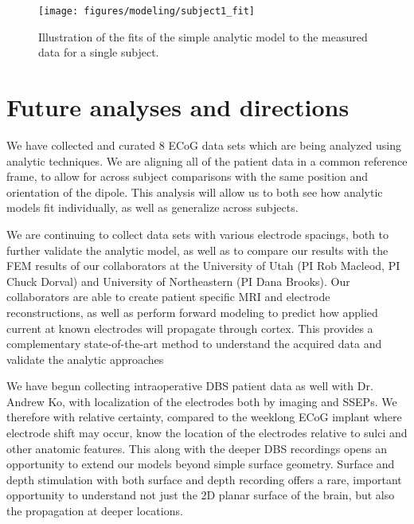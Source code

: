 \begin{figure}[ht]
	\centering
	\texttt{[image: figures/modeling/subject1\_fit]}
	\caption[Example one layer fit]{Illustration of the fits of the simple analytic model to the measured data for a single subject. 
	}
	\label{fig:exampOneLayerFit}
\end{figure}

\section{Future analyses and directions}

We have collected and curated 8 ECoG data sets which are being analyzed using analytic techniques. We are aligning all of the patient data in a common reference frame, to allow for across subject comparisons with the same position and orientation of the dipole. This analysis will allow us to both see how analytic models fit individually, as well as generalize across subjects. 

We are continuing to collect data sets with various electrode spacings, both to further validate the analytic model, as well as to compare our results with the FEM results of our collaborators at the University of Utah (PI Rob Macleod, PI Chuck Dorval) and University of Northeastern (PI Dana Brooks). Our collaborators are able to create patient specific MRI and electrode reconstructions, as well as perform forward modeling to predict how applied current at known electrodes will propagate through cortex. This provides a complementary state-of-the-art method to understand the acquired data and validate the analytic approaches

We have begun collecting intraoperative DBS patient data as well with Dr. Andrew Ko, with localization of the electrodes both by imaging and SSEPs. We therefore with relative certainty, compared to the weeklong ECoG implant where electrode shift may occur, know the location of the electrodes relative to sulci and other anatomic features. This along with the deeper DBS recordings opens an opportunity to extend our models beyond simple surface geometry. Surface and depth stimulation with both surface and depth recording offers a rare, important opportunity to understand not just the 2D planar surface of the brain, but also the propagation at deeper locations. 

